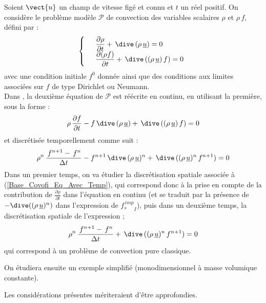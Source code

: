 Soient $\vect{u}$ un champ de vitesse fig\'e et connu et $t$ un r\'eel
positif. On consid\`ere le
probl\`eme mod\`ele $\mathcal{P}$ de convection des variables scalaires $\rho$ et $\rho\,f$, d\'efini par :
\begin{equation}
\left\{\begin{array}{ll}
&\displaystyle \frac {\partial \rho}{\partial t} + \,\dive\,(\rho\,\underline{u}) = 0\\
&\displaystyle \frac {\partial  (\rho f)}{\partial t} + \,\dive\,((\rho\,\underline{u})\,f) = 0
\end{array}\right.
\end{equation}
avec une condition initiale $f^0$ donn\'ee ainsi que des conditions aux
limites associ\'ees sur $f$ de type Dirichlet ou Neumann.\\
Dans \CS , la deuxi\`eme \'equation de $\mathcal{P}$ est r\'e\'ecrite en
continu, en utilisant la premi\`ere, sous la forme :\\
\begin{equation}
\displaystyle \rho\,\frac {\partial f}{\partial t} -
f\,\dive\,(\rho\,\underline{u}) + \,\dive\,((\rho\,\underline{u})\,f) = 0
\end{equation}
et discr\'etis\'ee temporellement comme suit :
\begin{equation}\label{Base_Covofi_Eq_Avec_Temp}
\displaystyle \rho^n \,\frac {\,f^{n+1} -\,f^n}{\Delta t} -
f^{n+1}\,\dive\,(\rho\,\underline{u})^n + \,\dive\,((\rho\,\underline{u})^n\,f^{n+1}) = 0
\end{equation}
Dans un premier temps, on va \'etudier la discr\'etisation spatiale associ\'ee
\`a (\ref{Base_Covofi_Eq_Avec_Temp}), qui correspond donc \`a la prise en compte de la
contribution de $\displaystyle\frac{\partial \rho}{\partial t}$ dans
l'\'equation en continu (et se traduit par la pr\'esence de
$-\dive((\rho\,\underline{u})^{n})$ dans l'expression de ${f_s^{\,imp}}_I $),
puis dans un deuxi\`eme temps, la discr\'etisation spatiale de l'expression ;\\
\begin{equation}\label{Base_Covofi_Eq_Sans_Temp}
\displaystyle \rho^n \,\frac {\,f^{n+1} -\,f^n}{\Delta t} +
\,\dive\,((\rho\,\underline{u})^n\,f^{n+1}) = 0
\end{equation}
qui correspond \`a un probl\`eme de convection pure classique.

On \'etudiera ensuite un exemple simplifi\'e (monodimensionnel \`a masse
volumique constante).


Les consid\'erations pr\'esentes m\'eriteraient d'\^etre approfondies.


